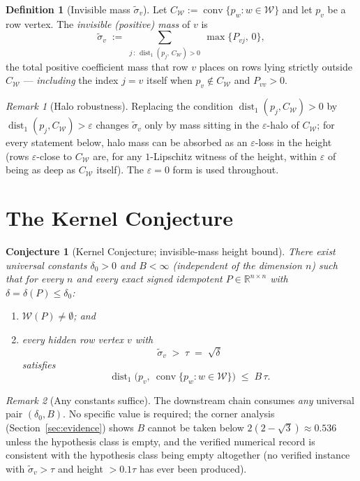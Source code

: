 \documentclass[11pt]{article}
\theoremstyle{plain}
\newtheorem{conjecture}{Conjecture}
\theoremstyle{definition}
\newtheorem{definition}{Definition}
\theoremstyle{remark}
\newtheorem{remark}{Remark}
\newcommand{\R}{\mathbb R}
\newcommand{\dist}{\operatorname{dist}_1}
\newcommand{\conv}{\operatorname{conv}}
\newcommand{\W}{\mathcal W}
\newcommand{\sigt}{\widetilde{\sigma}}
\begin{document}
\begin{definition}[Invisible mass $\sigt_v$]\label{def:sigt}
Let $C_{\W}:=\conv\{p_w:w\in\W\}$ and let $p_v$ be a row vertex. The \emph{invisible
(positive) mass} of $v$ is
\[
\sigt_v\;:=\;\sum_{j\,:\,\dist(p_j,\,C_\W)>0}\ \max\{P_{vj},\,0\},
\]
the total positive coefficient mass that row $v$ places on rows lying strictly outside
$C_\W$ --- \emph{including} the index $j=v$ itself when $p_v\notin C_\W$ and $P_{vv}>0$.
\end{definition}

\begin{remark}[Halo robustness]
Replacing the condition $\dist(p_j,C_\W)>0$ by $\dist(p_j,C_\W)>\varepsilon$ changes
$\sigt_v$ only by mass sitting in the $\varepsilon$-halo of $C_\W$; for every statement
below, halo mass can be absorbed as an $\varepsilon$-loss in the height (rows
$\varepsilon$-close to $C_\W$ are, for any $1$-Lipschitz witness of the height, within
$\varepsilon$ of being as deep as $C_\W$ itself). The $\varepsilon=0$ form is used
throughout.
\end{remark}

\section{The Kernel Conjecture}\label{sec:kernel}

\begin{conjecture}[Kernel Conjecture; invisible-mass height bound]\label{conj:kernel}
There exist universal constants $\delta_0>0$ and $B<\infty$ (independent of the dimension
$n$) such that for every $n$ and every exact signed idempotent $P\in\R^{n\times n}$ with
$\delta=\delta(P)\le\delta_0$:
\begin{enumerate}
\item[\textup{(i)}] $\W(P)\neq\emptyset$; and
\item[\textup{(ii)}] every \emph{hidden} row vertex $v$ with
\[
\sigt_v\;>\;\tau\;=\;\sqrt{\delta}
\]
satisfies
\[
\dist\!\big(p_v,\ \conv\{p_w:w\in\W\}\big)\;\le\; B\,\tau .
\]
\end{enumerate}
\end{conjecture}

\begin{remark}[Any constants suffice]
The downstream chain consumes \emph{any} universal pair $(\delta_0,B)$. No specific value
is required; the corner analysis (Section~\ref{sec:evidence}) shows $B$ cannot be taken
below $2(2-\sqrt3)\approx 0.536$ unless the hypothesis class is empty, and the verified
numerical record is consistent with the hypothesis class being empty altogether (no
verified instance with $\sigt_v>\tau$ and height $>0.1\tau$ has ever been produced).
\end{remark}
\end{document}
